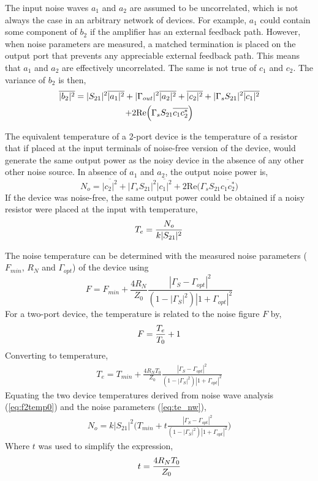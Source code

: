 \documentclass[journal]{IEEEtran}
\begin{document}
The input noise waves \(a_1\) and \(a_2\) are assumed to be uncorrelated, which is not always the case in an arbitrary network of devices. For example, \(a_1\) could contain some component of \(b_2\) if the amplifier has an external feedback path. However, when noise parameters are measured, a matched termination is placed on the output port that prevents any appreciable external feedback path. This means that \(a_1\) and \(a_2\) are effectively uncorrelated. The same is not true of \(c_1\) and \(c_2\). The variance of \(b_2\) is then,
\begin{gather}
\overline{|b_2|^2} = |S_{21}|^2\overline{|a_1|^2} + |\Gamma_{out}|^2\overline{|a_2|^2} + \overline{|c_2|^2} + |\Gamma_s S_{21}|^2 \overline{|c_1|^2} \notag \\
 + 2\textrm{Re}\Big(\Gamma_s S_{21} \overline{c_1c_2^*} \Big) \notag
\end{gather}

The equivalent temperature of a 2-port device is the temperature of a resistor that if placed at the input terminals of noise-free version of the device, would generate the same output power as the noisy device in the absence of any other other noise source. In absence of \(a_1\) and \(a_2\), the output noise power is,
\[N_o = \overline{|c_2|^2} + |\Gamma_s S_{21}|^2 \overline{|c_1|^2} + 2\textrm{Re}\Big(\Gamma_s S_{21} \overline{c_1c_2^*} \Big)\]
If the device was noise-free, the same output power could be obtained if a noisy resistor were placed at the input with temperature,
\begin{gather}
T_e = {N_o \over k|S_{21}|^2} \label{eq:f2temp0}
\end{gather}

The noise temperature can be determined with the measured noise parameters (\(F_{min}\), \(R_N\) and \(\Gamma_{opt}\)) of the device using
\[F = F_{min} + \frac{4R_N}{Z_0} \frac{|\Gamma_S - \Gamma_{opt}|^2}{(1-|\Gamma_S|^2)|1+\Gamma_{opt}|^2}\]
For a two-port device, the temperature is related to the noise figure \(F\) by,
\begin{gather}
F = {T_e \over T_0} + 1 \label{eq:f2temp}
\end{gather}
Converting to temperature,
\begin{gather}
{T_{e} } = {T_{min} } + \frac{4R_NT_0}{Z_0} \frac{|\Gamma_S - \Gamma_{opt}|^2}{(1-|\Gamma_S|^2)|1+\Gamma_{opt}|^2} \label{eq:te_nw}
\end{gather}
Equating the two device temperatures derived from noise wave analysis (\ref{eq:f2temp0}) and the noise parameters (\ref{eq:te_nw}),
\begin{gather}
N_o = k|S_{21}|^2 \Big(T_{min} + t \frac{|\Gamma_S - \Gamma_{opt}|^2}{(1-|\Gamma_S|^2)|1+\Gamma_{opt}|^2} \Big) \label{eq:nout}
\end{gather}
Where \(t\) was used to simplify the expression,
\[t = {4R_NT_0 \over Z_0}\]
\end{document}
